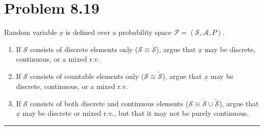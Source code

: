 \documentclass{article}
\newcommand{\horline}
           {\begin{center}
              \noindent\rule{8cm}{0.4pt}
            \end{center}}
\begin{document}
\section*{Problem 8.19}
Random variable $\underline{x}$ is defined over a probability space 
$\mathcal{P} = (\mathcal{S}, \mathcal{A}, P)$. 
\begin{enumerate}[label=(\alph*)]
  \item{If $\mathcal{S}$ consists of discrete elements only 
($\mathcal{S} \equiv \dot{\mathcal{S}}$), argue that $\underline{x}$ may be
discrete, continuous, or a mixed r.v.
       }
  \item{If $\mathcal{S}$ consists of countable elements only 
($\mathcal{S} \equiv \tilde{\mathcal{S}}$), argue that $\underline{x}$ may 
be discrete, continuous, or a mixed r.v.
       }
  \item{If $\mathcal{S}$ consists of both discrete and continuous elements
($\mathcal{S} \equiv \dot{\mathcal{S}} \cup \tilde{\mathcal{S}}$), argue 
that $\underline{x}$ may be discrete or mixed r.v., but that it may not be 
purely continuous.
       }
\end{enumerate}
\horline
\end{document}
